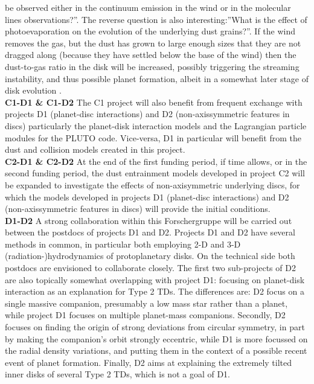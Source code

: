 \documentclass[10pt,fleqn,twoside]{article}
\begin{document}
be observed either in the continuum emission in the wind or in the
molecular lines observations?''. The reverse question is also
interesting:''What is the effect of photoevaporation on the evolution
of the underlying dust grains?''.  If the wind removes the gas, but the dust has
  grown to large enough sizes that they are not dragged along (because they
  have settled below the base of the wind) then the dust-to-gas ratio in the
  disk will be increased, possibly triggering the streaming instability, and
  thus possible planet formation, albeit in a somewhat later stage of disk
  evolution \citep[e.g.]{2005ApJ...623L.149T}.\\
{\bf C1-D1 \& C1-D2}
  The C1 project will also benefit from 
frequent exchange with projects D1 (planet-disc interactions) and D2
(non-axissymmetric features in discs)
particularly the planet-disk interaction models and the Lagrangian
particle modules for the PLUTO code. Vice-versa, D1 in particular will
benefit from the dust and collision models created in this
project. \\
{\bf C2-D1 \& C2-D2} At the end of the first funding period, if time allows, or
in the second funding period, the dust entrainment models developed in
project C2 will be expanded to investigate the effects of
non-axisymmetric underlying discs, for which the models developed in
projects D1 (planet-disc interactions) and D2 (non-axissymmetric
features in discs) will provide the initial conditions.  \\
{\bf D1-D2} A strong collaboration within this Forschergruppe will be carried
  out between the postdocs of projects D1 and D2.  Projects D1 and D2 have several
  methods in common, in particular both employing 2-D and 3-D
  (radiation-)hydrodynamics of protoplanetary disks.  On the technical side
  both postdocs are envisioned to collaborate closely.  The first two
  sub-projects of D2 are also topically somewhat overlapping with project
  D1: focusing on planet-disk interaction as an explanation for Type 2 TDs.
  The differences are: D2 focus on a single massive companion,
  presumably a low mass star rather than a planet, while project D1 focuses
  on multiple planet-mass companions. Secondly, D2 focuses on finding
  the origin of strong deviations from circular symmetry, in part by making
  the companion’s orbit strongly eccentric, while D1 is more focussed on 
  the radial density variations, and putting them in the context of a
  possible recent event of planet formation. Finally, D2 aims at explaining
  the extremely tilted inner disks of several Type 2 TDs, which is not a
  goal of D1.
\\
\end{document}
